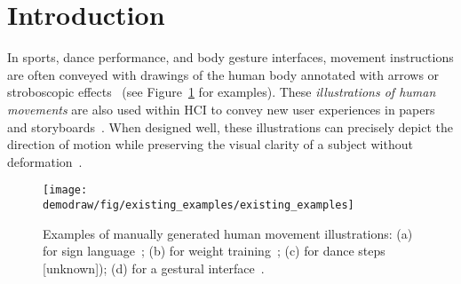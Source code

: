 
\section{Introduction}

In sports, dance performance,
and body gesture interfaces, movement instructions are often conveyed with drawings of the human body annotated with arrows or stroboscopic effects~\cite{cutting_representing_2002} (see Figure~\ref{fig:existing_examples} for examples).
These \textit{illustrations of human movements} are also used within HCI to convey new user experiences in papers and storyboards~\cite{Buxton:2007:SUE:1526229}.
When designed well, these illustrations can precisely depict the direction of motion while preserving the visual clarity of a subject without deformation~\cite{cutting_representing_2002}.

\begin{figure}[t]
  \centering
  \texttt{[image: \\demodraw/fig/existing\_examples/existing\_examples]}
  \caption{Examples of manually generated human movement illustrations: (a) for sign language~\protect\cite{corum:2012:sign}; (b) for weight training~\protect\cite{anderson2010stretching}; (c) for dance steps [unknown]); (d) for a gestural interface~\protect\cite{cohn2012humantenna}.}
  \label{fig:existing_examples}
\end{figure}

